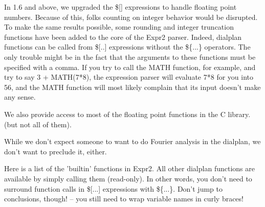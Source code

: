 In 1.6 and above, we upgraded the \$[] expressions to handle floating point numbers.
Because of this, folks counting on integer behavior would be disrupted. To make
the same results possible, some rounding and integer truncation functions have been
added to the core of the Expr2 parser. Indeed, dialplan functions can be called from
\$[..] expressions without the \$\{...\} operators. The only trouble might be in the fact that
the arguments to these functions must be specified with a comma. If you try to call
the MATH function, for example, and try to say 3 + MATH(7*8), the expression parser will
evaluate 7*8 for you into 56, and the MATH function will most likely complain that its
input doesn't make any sense.

We also provide access to most of the floating point functions in the C library. (but not all of them).

While we don't expect someone to want to do Fourier analysis in the dialplan, we
don't want to preclude it, either.

Here is a list of the 'builtin' functions in Expr2. All other dialplan functions
are available by simply calling them (read-only). In other words, you don't need to
surround function calls in \$[...] expressions with \$\{...\}. Don't jump to conclusions,
though! -- you still need to wrap variable names in curly braces!

